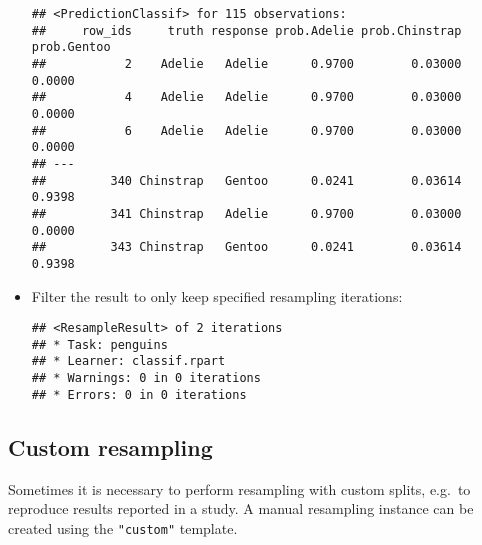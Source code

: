 \documentclass[
]{scrbook}
\newenvironment{Shaded}{\begin{snugshade}}{\end{snugshade}}
\newcommand{\CommentTok}[1]{\textcolor[rgb]{0.56,0.35,0.01}{\textit{#1}}}
\newcommand{\DecValTok}[1]{\textcolor[rgb]{0.00,0.00,0.81}{#1}}
\newcommand{\FunctionTok}[1]{\textcolor[rgb]{0.00,0.00,0.00}{#1}}
\newcommand{\NormalTok}[1]{#1}
\newcommand{\SpecialCharTok}[1]{\textcolor[rgb]{0.00,0.00,0.00}{#1}}
\renewenvironment{Shaded} {\begin{snugshade}\small} {\end{snugshade}}
\begin{document}
\begin{itemize}
\begin{Shaded}
\end{Shaded}

\begin{verbatim}
## <PredictionClassif> for 115 observations:
##     row_ids     truth response prob.Adelie prob.Chinstrap prob.Gentoo
##           2    Adelie   Adelie      0.9700        0.03000      0.0000
##           4    Adelie   Adelie      0.9700        0.03000      0.0000
##           6    Adelie   Adelie      0.9700        0.03000      0.0000
## ---                                                                  
##         340 Chinstrap   Gentoo      0.0241        0.03614      0.9398
##         341 Chinstrap   Adelie      0.9700        0.03000      0.0000
##         343 Chinstrap   Gentoo      0.0241        0.03614      0.9398
\end{verbatim}
\item
  Filter the result to only keep specified resampling iterations:

\begin{Shaded}
\end{Shaded}

\begin{verbatim}
## <ResampleResult> of 2 iterations
## * Task: penguins
## * Learner: classif.rpart
## * Warnings: 0 in 0 iterations
## * Errors: 0 in 0 iterations
\end{verbatim}
\end{itemize}

\hypertarget{resamp-custom}{%
\subsection{Custom resampling}\label{resamp-custom}}

Sometimes it is necessary to perform resampling with custom splits, e.g.~to reproduce results reported in a study.
A manual resampling instance can be created using the \texttt{"custom"} template.
\end{document}

